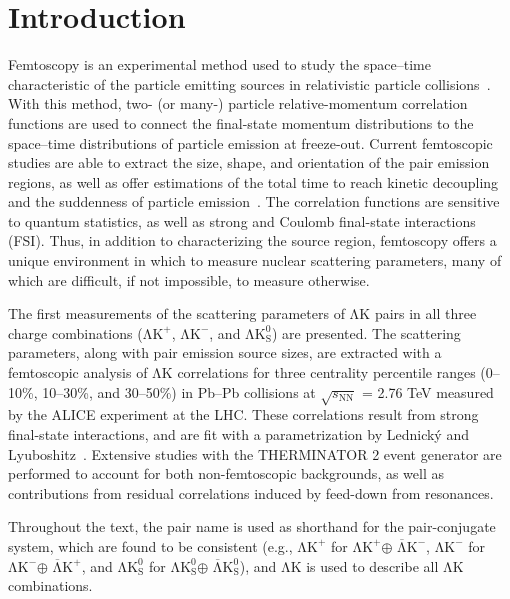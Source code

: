 \documentclass{svproc}
\newcommand{\LamK}{$\mathrm{\Lambda}\mathrm{K}$\xspace}
\newcommand{\LamKchP}{$\mathrm{\Lambda}\mathrm{K^{+}}$\xspace}
\newcommand{\ALamKchM}{$\overline{\mathrm{\Lambda}}\mathrm{K^{-}}$\xspace}
\newcommand{\LamKchM}{$\mathrm{\Lambda}\mathrm{K^{-}}$\xspace}
\newcommand{\ALamKchP}{$\overline{\mathrm{\Lambda}}\mathrm{K^{+}}$\xspace}
\newcommand{\LamKs}{$\mathrm{\Lambda}\mathrm{K^{0}_{S}}$\xspace}
\newcommand{\ALamKs}{$\overline{\mathrm{\Lambda}}\mathrm{K^{0}_{S}}$\xspace}
\begin{document}
\section{Introduction}
\label{sec:Introduction}

Femtoscopy is an experimental method used to study the space--time characteristic of the particle emitting sources in relativistic particle collisions~\cite{Lisa:2005dd}.  
With this method, two- (or many-) particle relative-momentum correlation functions are used to connect the final-state momentum distributions to the space--time distributions of particle emission at freeze-out.  
Current femtoscopic studies are able to extract the size, shape, and orientation of the pair emission regions, as well as offer estimations of the total time to reach kinetic decoupling and the suddenness of particle emission~\cite{Lisa:2005dd,Lisa:2008gf}.
The correlation functions are sensitive to quantum statistics, as well as strong and Coulomb final-state interactions (FSI).  
Thus, in addition to characterizing the source region, femtoscopy offers a unique environment in which to measure nuclear scattering parameters, many of which are difficult, if not impossible, to measure otherwise.  


The first measurements of the scattering parameters of \LamK pairs in all three charge combinations (\LamKchP, \LamKchM, and \LamKs) are presented.
The scattering parameters, along with pair emission source sizes, are extracted with a femtoscopic analysis of \LamK correlations for three centrality percentile ranges (0--10\%, 10--30\%, and 30--50\%) in Pb--Pb collisions at $\sqrt{s_{\mathrm{NN}}}$ = 2.76 TeV measured by the ALICE experiment at the LHC.  
These correlations result from strong final-state interactions, and are fit with a parametrization by Lednick\'y and Lyuboshitz~\cite{Lednicky:82}.  
Extensive studies with the THERMINATOR 2 event generator are performed to account for both non-femtoscopic backgrounds, as well as contributions from residual correlations induced by feed-down from resonances.

Throughout the text, the pair name is used as shorthand for the pair-conjugate system, which are found to be consistent (e.g., \LamKchP for \LamKchP $\oplus$ \ALamKchM, \LamKchM for \LamKchM $\oplus$ \ALamKchP, and \LamKs for \LamKs $\oplus$ \ALamKs), and \LamK is used to describe all \LamK combinations.
\end{document}
